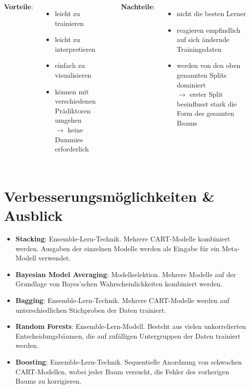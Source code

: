 \documentclass{beamer}
\begin{document}
\begin{frame}
	\begin{columns}[T, onlytextwidth]
			\textbf{Vorteile}:
			\begin{itemize}
				\item leicht zu trainieren
				\item leicht zu interpretieren
				\item einfach zu visualisieren
				\item können mit verschiedenen Prädiktoren umgehen \\$\rightarrow$ keine Dummies erforderlich
			\end{itemize}
		
			\textbf{Nachteile}:
			\begin{itemize}
				\item nicht die besten Lerner
				\item reagieren empfindlich auf sich ändernde Trainingsdaten
				\item werden von den oben genannten Splits dominiert \\$\rightarrow$ erster Split beeinflusst stark die Form des gesamten Baums
			\end{itemize}
	\end{columns}
\end{frame}


\section{Verbesserungsmöglichkeiten \& Ausblick}

\begin{frame}
		\begin{itemize}
			\item\textbf{Stacking}: Ensemble-Lern-Technik. Mehrere CART-Modelle kombiniert werden. Ausgaben der einzelnen Modelle  werden als Eingabe für ein Meta-Modell verwendet.
			\item\textbf{Bayesian Model Averaging}: Modellselektion. Mehrere Modelle auf der Grundlage von Bayes'schen Wahrscheinlichkeiten kombiniert werden.
			\item\textbf{Bagging}: Ensemble-Lern-Technik. Mehrere CART-Modelle werden auf unterschiedlichen Stichproben der Daten trainiert.
			\item\textbf{Random Forests}: Ensemble-Lern-Modell. Besteht aus vielen unkorrelierten Entscheidungsbäumen, die auf zufälligen Untergruppen der Daten trainiert werden.
			\item\textbf{Boosting}: Ensemble-Lern-Technik. Sequentielle Anordnung von schwachen CART-Modellen, wobei jeder Baum versucht, die Fehler des vorherigen Baums zu korrigieren.
		\end{itemize}
\end{frame}
\end{document}
